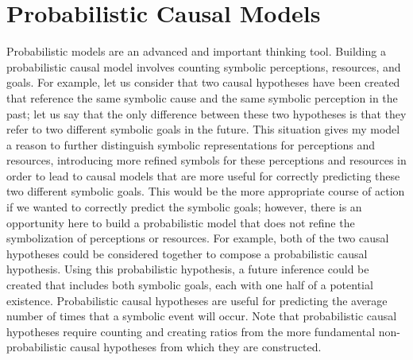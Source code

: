 \section{Probabilistic Causal Models}

Probabilistic models are an advanced and important thinking tool.
Building a probabilistic causal model involves counting symbolic
perceptions, resources, and goals.  For example, let us consider that
two causal hypotheses have been created that reference the same
symbolic cause and the same symbolic perception in the past; let us
say that the only difference between these two hypotheses is that they
refer to two different symbolic goals in the future.  This situation
gives my model a reason to further distinguish symbolic
representations for perceptions and resources, introducing more
refined symbols for these perceptions and resources in order to lead
to causal models that are more useful for correctly predicting these
two different symbolic goals.  This would be the more appropriate
course of action if we wanted to correctly predict the symbolic goals;
however, there is an opportunity here to build a probabilistic model
that does not refine the symbolization of perceptions or resources.
For example, both of the two causal hypotheses could be considered
together to compose a probabilistic causal hypothesis.  Using this
probabilistic hypothesis, a future inference could be created that
includes both symbolic goals, each with one half of a potential
existence.  Probabilistic causal hypotheses are useful for predicting
the average number of times that a symbolic event will occur.  Note
that probabilistic causal hypotheses require counting and creating
ratios from the more fundamental non-probabilistic causal hypotheses
from which they are constructed.

